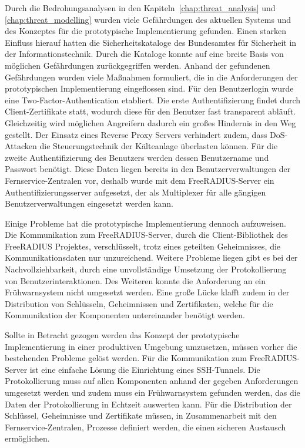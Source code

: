 \documentclass[11pt,a4paper]{report}
\begin{document}
Durch die Bedrohungsanalysen in den Kapiteln~\ref{chap:threat_analysis} und \ref{chap:threat_modelling} wurden viele Gefährdungen des aktuellen Systems und des Konzeptes für die prototypische Implementierung gefunden. Einen starken Einfluss hierauf hatten die Sicherheitskataloge des Bundesamtes für Sicherheit in der Informationstechnik. Durch die Kataloge konnte auf eine breite Basis von möglichen Gefährdungen zurückgegriffen werden. Anhand der gefundenen Gefährdungen wurden viele Maßnahmen formuliert, die in die Anforderungen der prototypischen Implementierung eingeflossen sind. Für den Benutzerlogin wurde eine Two-Factor-Authentication etabliert. Die erste Authentifizierung findet durch Client-Zertifikate statt, wodurch diese für den Benutzer fast transparent abläuft. Gleichzeitig wird möglichen Angreifern dadurch ein großes Hindernis in den Weg gestellt. Der Einsatz eines Reverse Proxy Servers verhindert zudem, dass DoS-Attacken die Steuerungstechnik der Kälteanlage überlasten können. Für die zweite Authentifizierung des Benutzers werden dessen Benutzername und Passwort benötigt. Diese Daten liegen bereits in den Benutzerverwaltungen der Fernservice-Zentralen vor, deshalb wurde mit dem FreeRADIUS-Server ein Authentifizierungsserver aufgesetzt, der als Multiplexer für alle gängigen Benutzerverwaltungen eingesetzt werden kann. 

Einige Probleme hat die prototypische Implementierung dennoch aufzuweisen. Die Kommunikation zum FreeRADIUS-Server, durch die Client-Bibliothek des FreeRADIUS Projektes, verschlüsselt, trotz eines geteilten Geheimnisses, die Kommunikationsdaten nur unzureichend. Weitere Probleme liegen gibt es bei der Nachvollziehbarkeit, durch eine unvollständige Umsetzung der Protokollierung von Benutzerinteraktionen. Des Weiteren konnte die Anforderung an ein Frühwarnsystem nicht umgesetzt werden. Eine große Lücke klafft zudem in der Distribution von Schlüsseln, Geheimnissen und Zertifikaten, welche für die Kommunikation der Komponenten untereinander benötigt werden.

Sollte in Betracht gezogen werden das Konzept der prototypische Implementierung in einer produktiven Umgebung umzusetzen, müssen vorher die bestehenden Probleme gelöst werden. Für die Kommunikation zum FreeRADIUS-Server ist eine einfache Lösung die Einrichtung eines SSH-Tunnels. Die Protokollierung muss auf allen Komponenten anhand der gegeben Anforderungen umgesetzt werden und zudem muss ein Frühwarnsystem gefunden werden, das die Daten der Protokollierung in Echtzeit auswerten kann. Für die Distribution der Schlüssel, Geheimnisse und Zertifikate müssen, in Zusammenarbeit mit den Fernservice-Zentralen, Prozesse definiert werden, die einen sicheren Austausch ermöglichen. 
\end{document}
